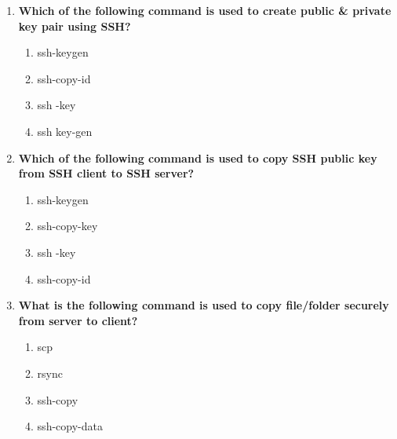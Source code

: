 \begin{flushleft}
\begin{enumerate}
		\item \textbf{Which of the following command is used to create public \& private key pair using SSH?}
		\begin{enumerate}[label=(\alph*)]
			\item ssh-keygen  %
			\item ssh-copy-id
			\item ssh -key
			\item ssh key-gen
		\end{enumerate}
		\bigskip
		\bigskip	
		
		\item \textbf{Which of the following command is used to copy SSH public key from SSH client to SSH server?}
		\begin{enumerate}[label=(\alph*)]
			\item ssh-keygen
			\item ssh-copy-key  
			\item ssh -key
			\item ssh-copy-id    %
		\end{enumerate}
		\bigskip
		\bigskip	

		\item \textbf{What is the following command is used to copy file/folder securely from server to client?}
		\begin{enumerate}[label=(\alph*)]
			\item scp  %
			\item rsync %
			\item ssh-copy
			\item ssh-copy-data   
		\end{enumerate}
		\bigskip
		\bigskip	
		
	\end{enumerate}
\end{flushleft}

\newpage

\afterpage{\blankpage}